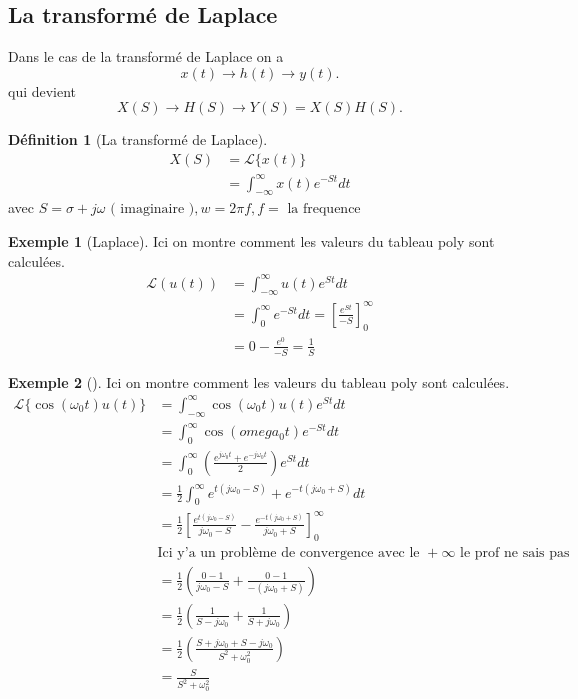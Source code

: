 \documentclass{article}
\theoremstyle{plain}%
\theoremstyle{definition}
\newtheorem{defn}{Définition}[section]
\newtheorem{exmp}{Exemple}[section]
\theoremstyle{remark}
\begin{document}
\subsection{La transformé de Laplace}
Dans le cas de la transformé de Laplace on a 
\[
    x(t) \rightarrow h(t) \rightarrow y(t)
.\]
qui devient
\[
    X(S) \rightarrow H(S) \rightarrow Y(S) = X(S)H(S)
.\]
\begin{defn}[La transformé de Laplace]
    \begin{align*}
        X(S) &= \mathcal{L}\{x(t)\} \\
            &= \int_{-\infty }^{\infty }x(t) e^{-St}dt
    \end{align*}
    avec $ S = \sigma + j \omega \text{ ( imaginaire )}, w = 2 \pi f, f=\text{ la frequence}$
\end{defn}
\begin{exmp}[Laplace]
    Ici on montre comment les valeurs du tableau poly sont calculées.
    \begin{align*}
        \mathcal{L}(u(t)) &= \int_{-\infty }^{\infty }u(t)e^{St}dt \\
            &= \int_{0}^{\infty }e^{-St}dt = [\frac{e^{St}}{-S}]^{\infty }_0 \\
            &= 0 - \frac{e^0}{-S} = \frac{1}{S}
    \end{align*}
\end{exmp}
\begin{exmp}[]
    Ici on montre comment les valeurs du tableau poly sont calculées.
    \begin{align*}
        \mathcal{L}\{\cos (\omega _0 t) u(t)\} &= \int_{-\infty }^{\infty }\cos (\omega _0 t) u(t)e^{St}dt \\
        &= \int_{0}^{\infty }\cos (omega_0 t) e^{-St}dt \\
        &= \int_{0}^{\infty }(\frac{e^{j \omega _0 t } + e^{-j \omega_0 t }}{2}) e^{St} dt \\
        &= \frac{1}{2} \int_{0}^{\infty } e^{t(j\omega _0 - S)} + e^{-t(j \omega _0 + S)} dt \\
        &= \frac{1}{2} [\frac{e^{t(j \omega _0 - S)}}{j \omega_0 - S} - \frac{e^{-t(j \omega _0 + S)}}{j \omega_0 + S}]_{0}^{\infty } \\
        & \text{Ici y'a un problème de convergence avec le } + \infty \text{ le prof ne sais pas} \\
        &= \frac{1}{2} (\frac{0 - 1}{j \omega _0 - S} + \frac{0 - 1}{-(j \omega _0 + S)}) \\
        &= \frac{1}{2} (\frac{1}{S - j \omega _0} + \frac{1}{S + j \omega _0}) \\
        &= \frac{1}{2} (\frac{S + j \omega _0 + S - j \omega _0}{S^2 + \omega _0^2}) \\
        &= \frac{S}{S^2 + \omega _0 ^2}
    \end{align*}
\end{exmp}
\end{document}
